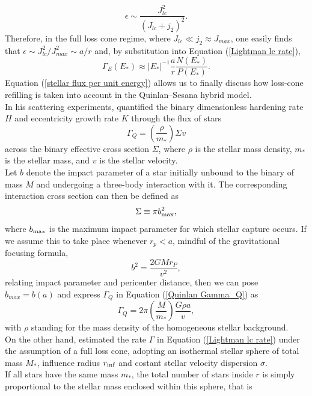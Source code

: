 \documentclass[12pt,twoside,openany]{book}
\begin{document}
\begin{equation}
 \epsilon \sim \frac{J_{lc}^2}{(J_{lc}+j_2)^2}.
\end{equation}
Therefore, in the full loss cone regime, where $J_{lc}\ll j_2\approx J_{max}$, one easily finds that
$\epsilon\sim J_{lc}^2/J_{max}^2\sim a/r$ and, by substitution into Equation (\ref{Lightman lc rate}),
\begin{equation}\label{stellar flux per unit energy}
 \Gamma_E(E_*)\approx |E_*|^{-1}\frac{a}{r}\frac{N(E_*)}{P(E_*)}.
\end{equation}
Equation (\ref{stellar flux per unit energy}) allows us to finally discuss how loss-cone refilling is taken into account in the Quinlan–Sesana hybrid model.\\In his scattering experiments, \textcite{Quinlan_1996} quantified the binary dimensionless hardening rate $H$ and eccentricity growth rate $K$ through the flux of stars
\begin{equation}\label{Quinlan Gamma_Q}
\Gamma_Q=\left(\frac{\rho}{m_*}\right)\Sigma v
\end{equation}
across the binary effective cross section $\Sigma$, where $\rho$ is the stellar mass density, $m_*$ is the stellar mass, and $v$ is the stellar velocity.\\Let $b$ denote the impact parameter of a star initially unbound to the binary of mass $M$ and undergoing a three-body interaction with it. The corresponding interaction cross section can then be defined as
\begin{equation}\label{binary cross section}
\Sigma \equiv \pi b_{\rm max}^2,
\end{equation}
where $b_{\rm max}$ is the maximum impact parameter for which stellar capture occurs. If we assume this to take place whenever $r_p<a$,
mindful of the gravitational focusing formula,
\begin{equation}\label{gravitational focusing}
 b^2=\frac{2GMr_P}{v^2},
\end{equation}
relating impact parameter and pericenter distance, then we can pose $b_{max}=b(a)$ and
express $\Gamma_Q$ in Equation (\ref{Quinlan Gamma_Q}) as
\begin{equation}
 \Gamma_Q=2\pi \left(\frac{M}{m_*}\right) \frac{G\rho a}{v},
\end{equation}
with $\rho$ standing for the mass density of the homogeneous stellar background.\\On the other hand, \textcite{Sesana_2010} estimated the rate $\Gamma$ in Equation (\ref{Lightman lc rate}) under the assumption of a full loss cone, adopting an isothermal stellar sphere of total mass $M_*$, influence radius $r_{\rm inf}$ and costant stellar velocity dispersion $\sigma$.\\If all stars have the same mass $m_*$, the total number of stars inside $r$ is simply proportional to the stellar mass enclosed within this sphere, that is
\end{document}
